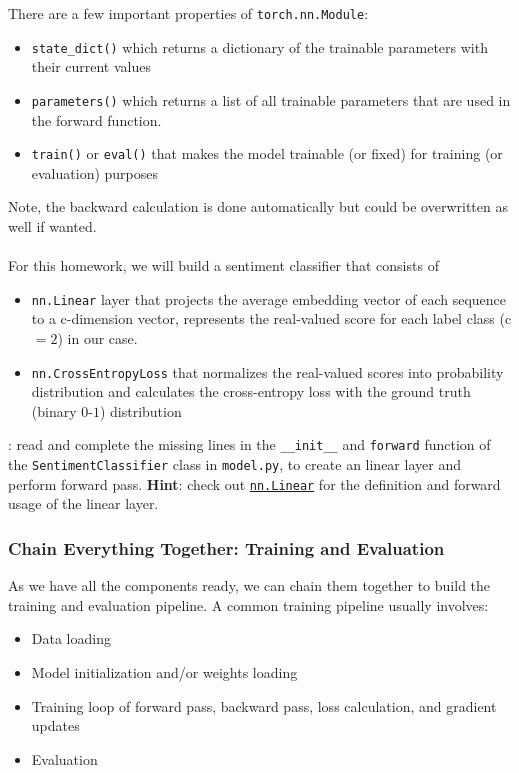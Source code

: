     There are a few important properties of \texttt{torch.nn.Module}:
    \begin{itemize}
        \item \texttt{state\_dict()} which returns a dictionary of the trainable parameters with their current values
        \item \texttt{parameters()} which returns a list of all trainable parameters that are used in the forward function.
        \item \texttt{train()} or \texttt{eval()} that makes the model trainable (or fixed) for training (or evaluation) purposes
    \end{itemize} 
    Note, the backward calculation is done automatically but could be overwritten as well if wanted.
    \\\\
    For this homework, we will build a sentiment classifier that consists of
    \begin{itemize}
        \item \texttt{nn.Linear} layer that projects the average embedding vector of each sequence to a c-dimension vector, represents the real-valued score for each label class (c $ =2$) in our case.
        \item \texttt{nn.CrossEntropyLoss} that normalizes the real-valued scores into probability distribution and calculates the cross-entropy loss with the ground truth (binary $0$-$1$) distribution 
    \end{itemize}

    \noindent\todo{}: read and complete the missing lines in the \texttt{\_\_init\_\_} and \texttt{forward} function of the \texttt{SentimentClassifier} class in \texttt{model.py}, to create an linear layer and perform forward pass.
    \noindent \textbf{Hint}: check out \href{https://pytorch.org/docs/stable/generated/torch.nn.Linear.html}{\texttt{nn.Linear}} for the definition and forward usage of the linear layer.

    \subsubsection{Chain Everything Together: Training and Evaluation} \noindent As we have all the components ready, we can chain them together to build the training and evaluation pipeline. A common training pipeline usually involves:
    \begin{itemize}
        \item Data loading
        \item Model initialization and/or weights loading
        \item Training loop of forward pass, backward pass, loss calculation, and gradient updates
        \item Evaluation
    \end{itemize}

